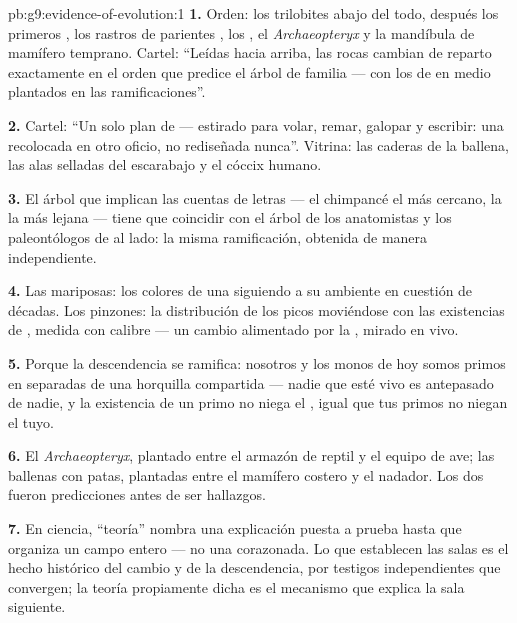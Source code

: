 \begin{solution}{pb:g9:evidence-of-evolution:1}
\textbf{1.} Orden: los trilobites abajo del todo, después los primeros
, los rastros de parientes , los , el
\emph{Archaeopteryx} y la mandíbula de mamífero temprano. Cartel:
``Leídas hacia arriba, las rocas cambian de reparto exactamente en el
orden que predice el árbol de familia --- con los de en medio plantados
en las ramificaciones''.

\textbf{2.} Cartel: ``Un solo plan de  --- estirado para volar,
remar, galopar y escribir: una  recolocada en otro oficio, no
rediseñada nunca''. Vitrina: las caderas de la ballena, las alas
selladas del escarabajo y el cóccix humano.

\textbf{3.} El árbol que implican las cuentas de letras --- el
chimpancé el más cercano, la  la más lejana --- tiene que
coincidir con el árbol de los anatomistas y los paleontólogos de al
lado: la misma ramificación, obtenida de manera independiente.

\textbf{4.} Las mariposas: los colores de una  siguiendo a su
ambiente en cuestión de décadas. Los pinzones: la distribución de los
picos moviéndose con las existencias de , medida con calibre
--- un cambio alimentado por la , mirado en vivo.

\textbf{5.} Porque la descendencia se ramifica: nosotros y los monos de
hoy somos primos en  separadas de una horquilla compartida ---
nadie que esté vivo es antepasado de nadie, y la existencia de un primo
no niega el , igual que tus primos no niegan el tuyo.

\textbf{6.} El \emph{Archaeopteryx}, plantado entre el armazón de
reptil y el equipo de ave; las ballenas  con patas, plantadas
entre el mamífero costero y el nadador. Los dos fueron predicciones
antes de ser hallazgos.

\textbf{7.} En ciencia, ``teoría'' nombra una explicación puesta a
prueba hasta que organiza un campo entero --- no una corazonada. Lo que
establecen las salas es el hecho histórico del cambio y de la
descendencia, por testigos independientes que convergen; la teoría
propiamente dicha es el mecanismo que explica la sala siguiente.


\end{solution}
